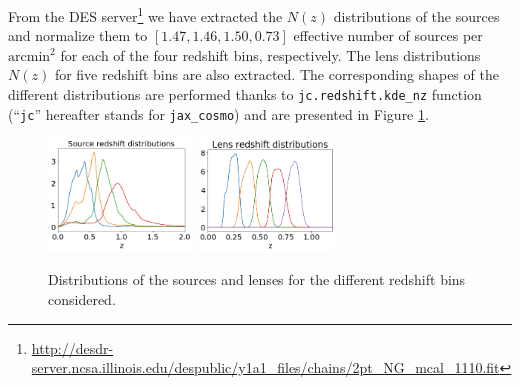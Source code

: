 \documentclass[twocolumn,twocolappendix,nofootinbib,iop]{openjournal}
\begin{document}
From the DES server\footnote{\url{http://desdr-server.ncsa.illinois.edu/despublic/y1a1_files/chains/2pt_NG_mcal_1110.fit}} we have extracted the $N(z)$ distributions of the sources and normalize them to $[1.47, 1.46, 1.50, 0.73]$ effective number of sources per $\mathrm{arcmin}^2$ for each of the four redshift bins, respectively. The lens distributions $N(z)$ for five redshift bins are also extracted. The corresponding shapes of the different distributions are performed thanks to \texttt{jc.redshift.kde\_nz} function (``\texttt{jc}'' hereafter stands for \texttt{jax\_cosmo}) and are presented in Figure \ref{fig-DESY1-src-lens-redshift}.
\begin{figure}
\centering
\includegraphics[height=3cm]{figures/DESY1-source-redshift.png}
\includegraphics[height=3cm]{figures/DESY1-lens-redshift.png}
\caption{Distributions of the sources and lenses for the different redshift bins considered.}
\label{fig-DESY1-src-lens-redshift}
\end{figure}
\end{document}
